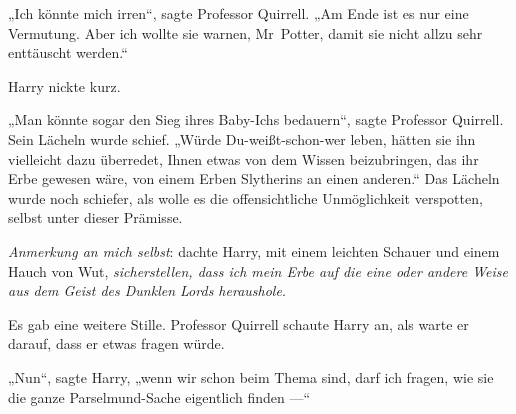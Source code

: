 „Ich könnte mich irren“, sagte Professor Quirrell.
„Am Ende ist es nur eine Vermutung. Aber ich wollte sie warnen, Mr~Potter, damit sie nicht allzu sehr enttäuscht werden.“

Harry nickte kurz.

„Man könnte sogar den Sieg ihres Baby-Ichs bedauern“, sagte Professor Quirrell. Sein Lächeln wurde schief.
„Würde Du-weißt-schon-wer leben, hätten sie ihn vielleicht dazu überredet, Ihnen etwas von dem Wissen beizubringen, das ihr Erbe gewesen wäre, von einem Erben Slytherins an einen anderen.“ Das Lächeln wurde noch schiefer, als wolle es die offensichtliche Unmöglichkeit verspotten, selbst unter dieser Prämisse.

\emph{Anmerkung an mich selbst}: dachte Harry, mit einem leichten Schauer und einem Hauch von Wut, \emph{sicherstellen, dass ich mein Erbe auf die eine oder andere Weise aus dem Geist des Dunklen Lords heraushole}.

Es gab eine weitere Stille. Professor Quirrell schaute Harry an, als warte er darauf, dass er etwas fragen würde.

„Nun“, sagte Harry, „wenn wir schon beim Thema sind, darf ich fragen, wie sie die ganze Parselmund-Sache eigentlich finden —“

